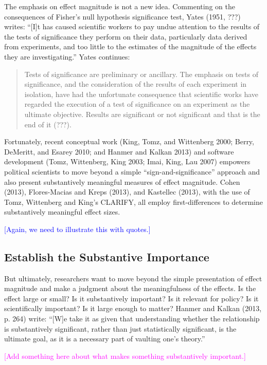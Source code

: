 \documentclass[12pt]{article}
\newcommand{\kelly}[1]{\textcolor{blue}{#1}}
\newcommand{\carlisle}[1]{\textcolor{magenta}{#1}}
\begin{document}
The emphasis on effect magnitude is not a new idea. Commenting on the consequences of Fisher's null hypothesis significance test, Yates (1951, ???) writes: ``[I]t has caused scientific workers to pay undue attention to the results of the tests of significance they perform on their data, particularly data derived from experiments, and too little to the estimates of the magnitude of the effects they are investigating.'' Yates continues: 

\begin{quote}
Tests of significance are preliminary or ancillary. The emphasis on tests of significance, and the consideration of the results of each experiment in isolation, have had the unfortunate consequence that scientific works have regarded the execution of a test of significance on an experiment as the ultimate objective. Results are significant or not significant and that is the end of it (???).
\end{quote}

Fortunately, recent conceptual work (King, Tomz, and Wittenberg 2000; Berry, DeMeritt, and Esarey 2010; and Hanmer and Kalkan 2013) and software development (Tomz, Wittenberg, King 2003; Imai, King, Lau 2007) empowers political scientists to move beyond a simple ``sign-and-significance'' approach and also present substantively meaningful measures of effect magnitude. Cohen (2013), Flores-Macias and Kreps (2013), and Kastellec (2013), with the use of Tomz, Wittenberg and King's CLARIFY, all employ first-differences to determine substantively meaningful effect sizes.

\kelly{[Again, we need to illustrate this with quotes.]}

\subsection*{Establish the Substantive Importance}

But ultimately, researchers want to move beyond the simple presentation of effect magnitude and make a judgment about the meaningfulness of the effects. Is the effect large or small? Is it substantively important? Is it relevant for policy? Is it scientifically important? Is it large enough to matter? Hanmer and Kalkan (2013, p. 264) write: ``[W]e take it as given that understanding whether the relationship is substantively significant, rather than just statistically significant, is the ultimate goal, as it is a necessary part of vaulting one's theory.''

\carlisle{[Add something here about what makes something substantively important.]}
\end{document}
